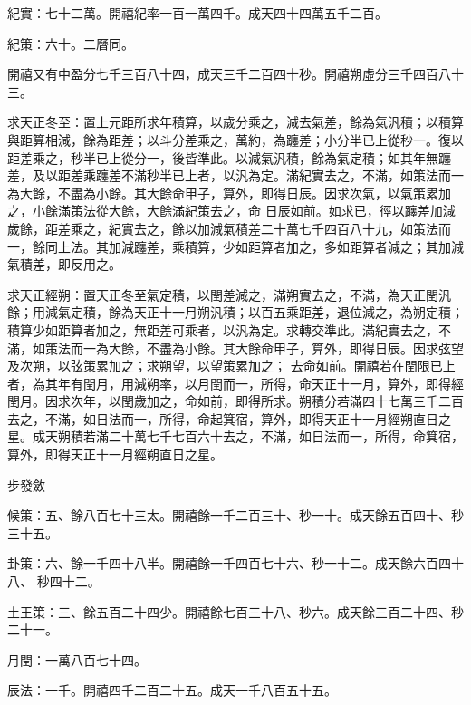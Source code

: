 \begin{pinyinscope}
 紀實：七十二萬。開禧紀率一百一萬四千。成天四十四萬五千二百。



 紀策：六十。二曆同。



 開禧又有中盈分七千三百八十四，成天三千二百四十秒。開禧朔虛分三千四百八十三。



 求天正冬至：置上元距所求年積算，以歲分乘之，減去氣差，餘為氣汎積；以積算與距算相減，餘為距差；以斗分差乘之，萬約，為躔差；小分半已上從秒一。復以距差乘之，秒半已上從分一，後皆準此。以減氣汎積，餘為氣定積；如其年無躔差，及以距差乘躔差不滿秒半已上者，以汎為定。滿紀實去之，不滿，如策法而一為大餘，不盡為小餘。其大餘命甲子，算外，即得日辰。因求次氣，以氣策累加之，小餘滿策法從大餘，大餘滿紀策去之，命
 日辰如前。如求已，徑以躔差加減歲餘，距差乘之，紀實去之，餘以加減氣積差二十萬七千四百八十九，如策法而一，餘同上法。其加減躔差，乘積算，少如距算者加之，多如距算者減之；其加減氣積差，即反用之。



 求天正經朔：置天正冬至氣定積，以閏差減之，滿朔實去之，不滿，為天正閏汎餘；用減氣定積，餘為天正十一月朔汎積；以百五乘距差，退位減之，為朔定積；積算少如距算者加之，無距差可乘者，以汎為定。求轉交準此。滿紀實去之，不滿，如策法而一為大餘，不盡為小餘。其大餘命甲子，算外，即得日辰。因求弦望及次朔，以弦策累加之；求朔望，以望策累加之；
 去命如前。開禧若在閏限已上者，為其年有閏月，用減朔率，以月閏而一，所得，命天正十一月，算外，即得經閏月。因求次年，以閏歲加之，命如前，即得所求。朔積分若滿四十七萬三千二百去之，不滿，如日法而一，所得，命起箕宿，算外，即得天正十一月經朔直日之星。成天朔積若滿二十萬七千七百六十去之，不滿，如日法而一，所得，命箕宿，算外，即得天正十一月經朔直日之星。



 步發斂



 候策：五、餘八百七十三太。開禧餘一千二百三十、秒一十。成天餘五百四十、秒三十五。



 卦策：六、餘一千四十八半。開禧餘一千四百七十六、秒一十二。成天餘六百四十八、
 秒四十二。



 土王策：三、餘五百二十四少。開禧餘七百三十八、秒六。成天餘三百二十四、秒二十一。



 月閏：一萬八百七十四。



 辰法：一千。開禧四千二百二十五。成天一千八百五十五。




\end{pinyinscope}
